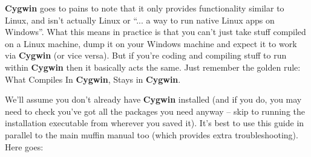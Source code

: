\documentclass[11pt,fleqn]{book} %
\begin{document}
\textbf{Cygwin} goes to pains to note that it only provides
functionality similar to Linux, and isn’t actually Linux or ``... a
way to run native Linux apps on Windows''. What this means in practice
is that you can’t just take stuff compiled on a Linux machine, dump it
on your Windows machine and expect it to work via \textbf{Cygwin} (or
vice versa). But if you’re coding and compiling stuff to run within
\textbf{Cygwin} then it basically acts the same. Just remember the
golden rule: What Compiles In \textbf{Cygwin}, Stays in
\textbf{Cygwin}.

We’ll assume you don’t already have \textbf{Cygwin} installed (and if
you do, you may need to check you’ve got all the packages you need
anyway – skip to running the installation executable from wherever you
saved it). It’s best to use this guide in parallel to the main muffin
manual too (which provides extra troubleshooting). Here goes:
\end{document}
